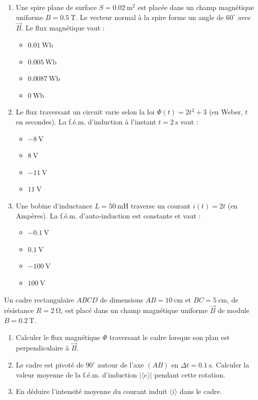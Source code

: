 \documentclass[11pt]{article}
\begin{document}
\begin{exercice}
\begin{enumerate}
    \item Une spire plane de surface $S = \SI{0,02}{\square\meter}$ est placée dans un champ magnétique uniforme $B = \SI{0,5}{\tesla}$. Le vecteur normal à la spire forme un angle de $60^\circ$ avec $\vec{B}$. Le flux magnétique vaut :
    \begin{itemize}
        \item[A)] $\SI{0,01}{\weber}$
        \item[B)] $\SI{0,005}{\weber}$
        \item[C)] $\SI{0,0087}{\weber}$
        \item[D)] $\SI{0}{\weber}$
    \end{itemize}
    \item Le flux traversant un circuit varie selon la loi $\Phi(t) = 2t^2 + 3$ (en Weber, $t$ en secondes). La f.é.m. d'induction à l'instant $t = \SI{2}{\second}$ vaut :
    \begin{itemize}
        \item[A)] $\SI{-8}{\volt}$
        \item[B)] $\SI{8}{\volt}$
        \item[C)] $\SI{-11}{\volt}$
        \item[D)] $\SI{11}{\volt}$
    \end{itemize}
    \item Une bobine d'inductance $L = \SI{50}{\milli\henry}$ traverse un courant $i(t) = 2t$ (en Ampères). La f.é.m. d'auto-induction est constante et vaut :
    \begin{itemize}
        \item[A)] $\SI{-0,1}{\volt}$
        \item[B)] $\SI{0,1}{\volt}$
        \item[C)] $\SI{-100}{\volt}$
        \item[D)] $\SI{100}{\volt}$
    \end{itemize}
\end{enumerate}
\end{exercice}

\begin{exercice}
Un cadre rectangulaire $ABCD$ de dimensions $AB = \SI{10}{\centi\meter}$ et $BC = \SI{5}{\centi\meter}$, de résistance $R = \SI{2}{\ohm}$, est placé dans un champ magnétique uniforme $\vec{B}$ de module $B = \SI{0,2}{\tesla}$.
\begin{enumerate}
    \item Calculer le flux magnétique $\Phi$ traversant le cadre lorsque son plan est perpendiculaire à $\vec{B}$.
    \item Le cadre est pivoté de $90^\circ$ autour de l'axe $(AB)$ en $\Delta t = \SI{0,1}{\second}$. Calculer la valeur moyenne de la f.é.m. d'induction $| \langle e \rangle |$ pendant cette rotation.
    \item En déduire l'intensité moyenne du courant induit $\langle i \rangle$ dans le cadre.
\end{enumerate}
\end{exercice}
\end{document}
